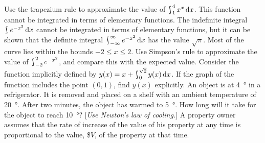 \begin{questions}
  \questioA Use the trapezium rule to approximate the value of $ \rint^{4}_{1} x^x \dif{x} $. This function cannot
            be integrated in terms of elementary functions.
  \questioM The indefinite integral $ \rint e^{-x^2} \dif{x} $ cannot be integrated in terms of elementary
            functions, but it can be shown that the definite integral $ \rint^{\infty}_{-\infty} e^{-x^2} \dif{x} $
            has the value $ \sqrt{\pi} $. Most of the curve lies within the bounds $ -2 \leq x \leq 2 $. Use Simpson's
            rule to approximate the value of $ \rint^{2}_{-2} e^{-x^2} $, and compare this with the expected value.
  \questioM Consider the function implicitly defined by $ y(x) = x + \rint^{\sqrt{2}}_0 y(x) \dif{x} $. If the graph
            of the function includes the point $ (0,1) $, find $ y(x) $ explicitly.
  \questioE An object is at \SI{4}{\degree} in a refrigerator. It is removed and placed on a shelf with an ambient
            temperature of \SI{20}{\degree}. After two minutes, the object has warmed to \SI{5}{\degree}. How long will
            it take for the object to reach \SI{10}{\degree}? [\textit{Use Newton's law of cooling.}]
  \questioE A property owner assumes that the rate of increase of the value of his property at any time is proportional
            to the value, \$$V$, of the property at that time.
\end{questions}
